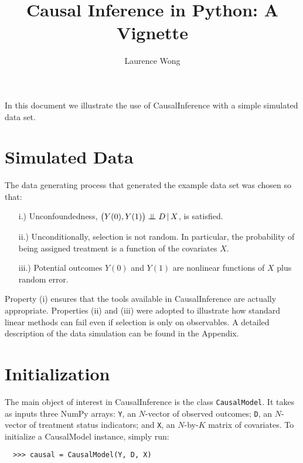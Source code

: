 \documentclass[12pt]{article}
\newcommand\independent{\protect\mathpalette{\protect\independenT}{\perp}}
\def\independenT#1#2{\mathrel{\setbox0\hbox{$#1#2$}%
\copy0\kern-\wd0\mkern4mu\box0}}  %
\theoremstyle{definition}
\theoremstyle{definition}
\theoremstyle{definition}
\theoremstyle{remark}
\begin{document}

\title{Causal Inference in Python: A Vignette}
\author{Laurence Wong}
\maketitle

In this document we illustrate the use of CausalInference with a simple simulated data set.

\section*{Simulated Data}

The data generating process that generated the example data set was chosen so that:
\begin{itemize}
\item[i.)] Unconfoundedness, $\big(Y(0), Y(1)\big) \independent D \, | \, X$, is satisfied.
\item[ii.)] Unconditionally, selection is not random. In particular, the probability of being assigned treatment is a function of the covariates $X$.
\item[iii.)] Potential outcomes $Y(0)$ and $Y(1)$ are nonlinear functions of $X$ plus random error.
\end{itemize}

Property (i) ensures that the tools available in CausalInference are actually appropriate. Properties (ii) and (iii) were adopted to illustrate how standard linear methods can fail even if selection is only on observables. A detailed description of the data simulation can be found in the Appendix.

\section*{Initialization}

The main object of interest in CausalInference is the class \texttt{CausalModel}. It takes as inputs three NumPy arrays: \texttt{Y}, an $N$-vector of observed outcomes; \texttt{D}, an $N$-vector of treatment status indicators; and \texttt{X}, an $N$-by-$K$ matrix of covariates. To initialize a CausalModel instance, simply run:
\begin{verbatim}
  >>> causal = CausalModel(Y, D, X)
\end{verbatim}
\end{document}
